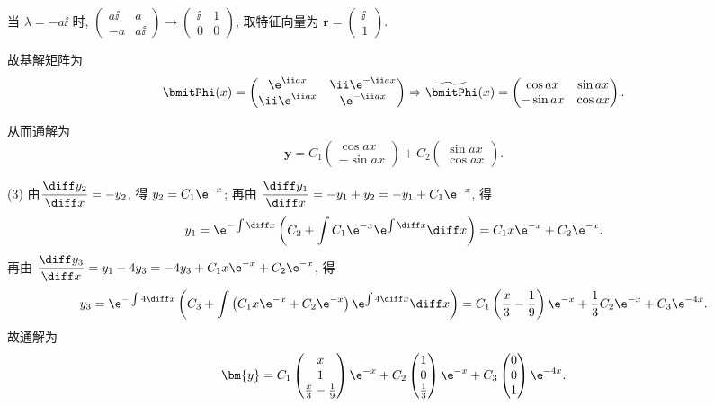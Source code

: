 \begin{solve}
  当 $\lambda=-a\ii$ 时, $\begin{pmatrix}a\ii&a\\-a&a\ii\end{pmatrix}\to\begin{pmatrix}\ii&1\\0&0\end{pmatrix}$, 
  取特征向量为 $\bm{r}=\begin{pmatrix}\ii\\1\end{pmatrix}$.

  故基解矩阵为
  \[\bmitPhi(x)=\begin{pmatrix}\e^{\ii ax}&\ii\e^{-\ii ax}\\\ii\e^{\ii ax}&\e^{-\ii ax}\end{pmatrix}
  \Rightarrow\widetilde{\bmitPhi}(x)=\begin{pmatrix}\cos ax&\sin ax\\-\sin ax&\cos ax\end{pmatrix}.\]

  从而通解为
  \[\bm{y}=C_1\begin{pmatrix}\cos ax\\-\sin ax\end{pmatrix}
    + C_2\begin{pmatrix}\sin ax\\\cos ax\end{pmatrix}.\]

  (3) 由$\displaystyle\frac{\diff y_2}{\diff x}=-y_2$, 得 $y_2=C_1\e^{-x}$; 
  再由 $\displaystyle\frac{\diff y_1}{\diff x}=-y_1+y_2=-y_1+C_1\e^{-x}$, 得
  \[\displaystyle y_1=\e^{-\int\diff x}\left(C_2+\int C_1\e^{-x}\e^{\int\diff x}\diff x\right)
    = C_1x\e^{-x}+C_2\e^{-x}.\]
  再由 $\displaystyle\frac{\diff y_3}{\diff x}=y_1-4y_3=-4y_3+C_1x\e^{-x}+C_2\e^{-x}$, 得
  \[\displaystyle y_3=\e^{-\int4\diff x}\left(C_3+\int\left(C_1x\e^{-x}+C_2\e^{-x}\right)
    \e^{\int4\diff x}\diff x\right)=C_1\left(\frac{x}{3}-\frac{1}{9}\right)\e^{-x}
    +\frac{1}{3}C_2\e^{-x}+C_3\e^{-4x}.\]
  故通解为
  \[\bm{y}=C_1\begin{pmatrix}x\\1\\\frac{x}{3}-\frac{1}{9}\end{pmatrix}\e^{-x}+C_2
    \begin{pmatrix}1\\0\\\frac{1}{3}\end{pmatrix}\e^{-x}
    +C_3\begin{pmatrix}0\\0\\1\end{pmatrix}\e^{-4x}.\]


\end{solve}
